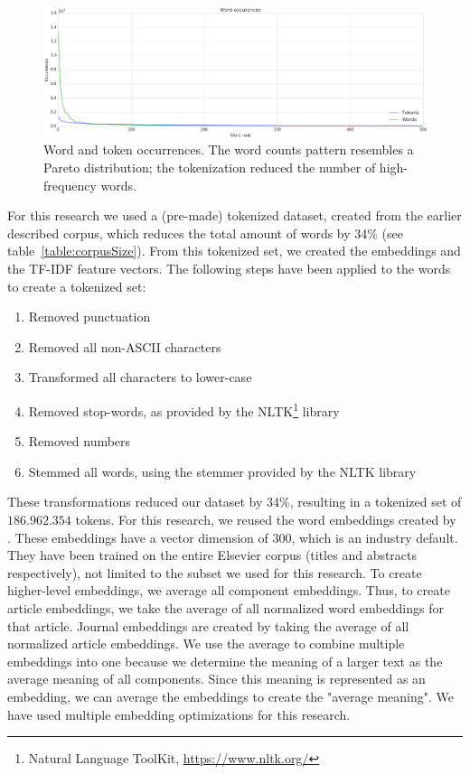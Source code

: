 \documentclass[../../Thesis.tex]{subfiles}
\begin{document}
\FloatBarrier
\begin{figure}[hbt]
\includegraphics[width=6.5in]{Plots/word_occurrences}
\caption{Word and token occurrences. The word counts pattern resembles a Pareto distribution; the tokenization reduced the number of high-frequency words.}\label{figure:wordTokenOccurrence}
\end{figure}
\FloatBarrier
{}
For this research we used a (pre-made) tokenized dataset, created from the earlier described corpus, which reduces the total amount of words by 34\% (see table~\ref{table:corpusSize}). From this tokenized set, we created the embeddings and the TF-IDF feature vectors.
The following steps have been applied to the words to create a tokenized set:
\begin{enumerate}
\item{Removed punctuation}
\item{Removed all non-ASCII characters}
\item{Transformed all characters to lower-case}
\item{Removed stop-words, as provided by the NLTK\footnote{Natural Language ToolKit, \url{https://www.nltk.org/}} library}
\item{Removed numbers}
\item{Stemmed all words, using the stemmer provided by the NLTK library}
\end{enumerate}
These transformations reduced our dataset by 34\%, resulting in a tokenized set of $186.962.354$ tokens.
\clearpage
{}
For this research, we reused the word embeddings created by \citet{Truong2017Thesis}. These embeddings have a vector dimension of 300, which is an industry default. They have been trained on the entire Elsevier corpus (titles and abstracts respectively), not limited to the subset we used for this research. To create higher-level embeddings, we average all component embeddings. Thus, to create article embeddings, we take the average of all normalized word embeddings for that article. Journal embeddings are created by taking the average of all normalized article embeddings. We use the average to combine multiple embeddings into one because we determine the meaning of a larger text as the average meaning of all components. Since this meaning is represented as an embedding, we can average the embeddings to create the "average meaning". We have used multiple embedding optimizations for this research.
\end{document}
